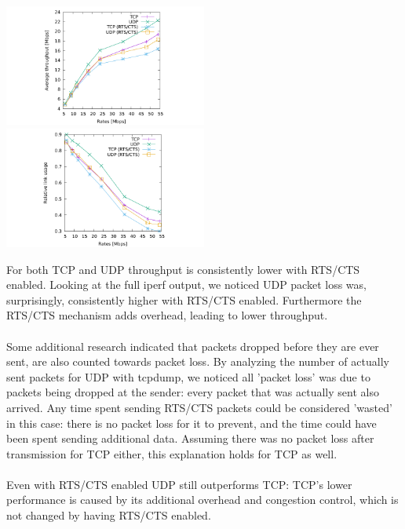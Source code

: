 \includegraphics[width=0.5\textwidth]{traces/L3-3-1-tput.pdf}
\includegraphics[width=0.5\textwidth]{traces/L3-3-1-usage.pdf}

For both TCP and UDP throughput is consistently lower with RTS/CTS enabled. Looking at the full iperf  output, we noticed UDP packet loss was, surprisingly, consistently higher with RTS/CTS enabled. Furthermore the RTS/CTS mechanism adds overhead, leading to lower throughput. \\ \\
Some additional research indicated that packets dropped before they are ever sent, are also counted towards packet loss. By analyzing the number of actually sent packets for UDP with tcpdump, we noticed all 'packet loss' was due to packets being dropped at the sender: every packet that was actually sent also arrived. Any time spent sending RTS/CTS packets could be considered 'wasted' in this case: there is no packet loss for it to prevent, and the time could have been spent sending additional data. Assuming there was no packet loss after transmission for TCP either, this explanation holds for TCP as well. \\ \\ Even with RTS/CTS enabled UDP still outperforms TCP: TCP's lower performance is caused by its additional overhead and congestion control, which is not changed by having RTS/CTS enabled.
